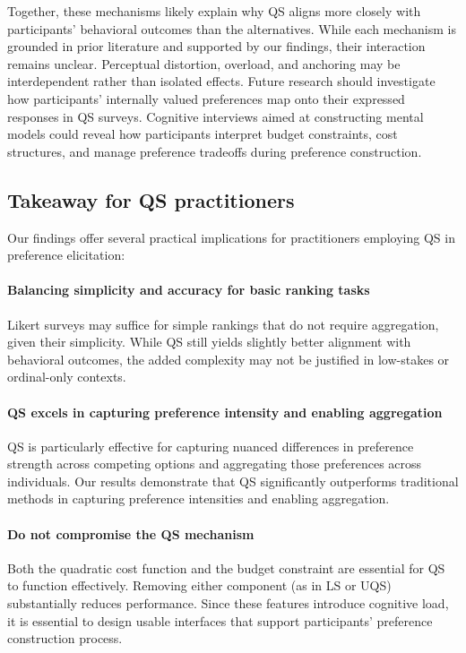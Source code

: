 Together, these mechanisms likely explain why QS aligns more closely with participants' behavioral outcomes than the alternatives. While each mechanism is grounded in prior literature and supported by our findings, their interaction remains unclear. Perceptual distortion, overload, and anchoring may be interdependent rather than isolated effects. Future research should investigate how participants' internally valued preferences map onto their expressed responses in QS surveys. Cognitive interviews aimed at constructing mental models could reveal how participants interpret budget constraints, cost structures, and manage preference tradeoffs during preference construction.

\subsection{Takeaway for QS practitioners}
Our findings offer several practical implications for practitioners employing QS in preference elicitation:

\paragraph{Balancing simplicity and accuracy for basic ranking tasks}
Likert surveys may suffice for simple rankings that do not require aggregation, given their simplicity. While QS still yields slightly better alignment with behavioral outcomes, the added complexity may not be justified in low-stakes or ordinal-only contexts.

\paragraph{QS excels in capturing preference intensity and enabling aggregation}
QS is particularly effective for capturing nuanced differences in preference strength across competing options and aggregating those preferences across individuals. Our results demonstrate that QS significantly outperforms traditional methods in capturing preference intensities and enabling aggregation.

\paragraph{Do not compromise the QS mechanism}
Both the quadratic cost function and the budget constraint are essential for QS to function effectively. Removing either component (as in LS or UQS) substantially reduces performance. Since these features introduce cognitive load, it is essential to design usable interfaces that support participants' preference construction process.

